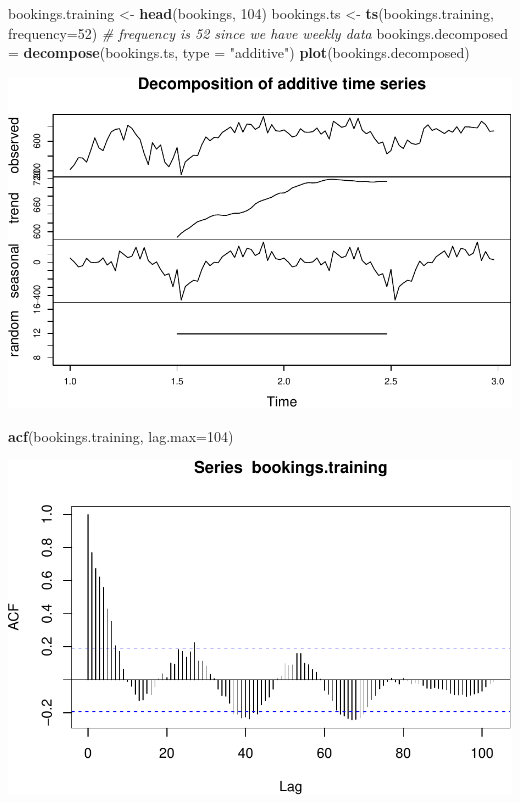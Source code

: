 \documentclass[]{article}
\newenvironment{Shaded}{\begin{snugshade}}{\end{snugshade}}
\newcommand{\CommentTok}[1]{\textcolor[rgb]{0.56,0.35,0.01}{\textit{#1}}}
\newcommand{\DataTypeTok}[1]{\textcolor[rgb]{0.13,0.29,0.53}{#1}}
\newcommand{\DecValTok}[1]{\textcolor[rgb]{0.00,0.00,0.81}{#1}}
\newcommand{\KeywordTok}[1]{\textcolor[rgb]{0.13,0.29,0.53}{\textbf{#1}}}
\newcommand{\NormalTok}[1]{#1}
\newcommand{\StringTok}[1]{\textcolor[rgb]{0.31,0.60,0.02}{#1}}
\begin{document}
\begin{Shaded}
\begin{Highlighting}[]
\NormalTok{bookings.training <-}\StringTok{ }\KeywordTok{head}\NormalTok{(bookings, }\DecValTok{104}\NormalTok{)}
\NormalTok{bookings.ts <-}\StringTok{ }\KeywordTok{ts}\NormalTok{(bookings.training, }\DataTypeTok{frequency=}\DecValTok{52}\NormalTok{) }\CommentTok{# frequency is 52 since we have weekly data}
\NormalTok{bookings.decomposed =}\StringTok{ }\KeywordTok{decompose}\NormalTok{(bookings.ts, }\DataTypeTok{type =} \StringTok{"additive"}\NormalTok{)}
\KeywordTok{plot}\NormalTok{(bookings.decomposed)}
\end{Highlighting}
\end{Shaded}

\begin{center}\includegraphics{bookings_forecast_files/figure-latex/unnamed-chunk-4-1} \end{center}

\begin{Shaded}
\begin{Highlighting}[]
\KeywordTok{acf}\NormalTok{(bookings.training, }\DataTypeTok{lag.max=}\DecValTok{104}\NormalTok{)}
\end{Highlighting}
\end{Shaded}

\begin{center}\includegraphics{bookings_forecast_files/figure-latex/unnamed-chunk-4-2} \end{center}
\end{document}
